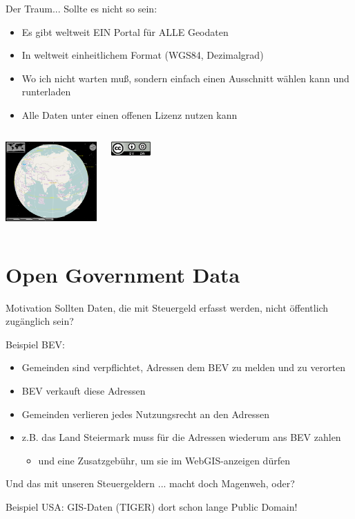 \documentclass{beamer}
\begin{document}
\begin{frame}{Der Traum...}
	Sollte es nicht so sein:
	\begin{itemize}
		\item Es gibt weltweit EIN Portal für ALLE Geodaten
		\item In weltweit einheitlichem Format (WGS84, Dezimalgrad)
		\item Wo ich nicht warten muß, sondern einfach einen Ausschnitt wählen kann und runterladen
		\item Alle Daten unter einen offenen Lizenz nutzen kann
	\end{itemize}

	\begin{columns}[c] 
		    \begin{center}
	\includegraphics[width=3.5cm]{marble.png}
	\end{center}
	    \begin{center}
		\includegraphics[width=1.5cm]{cc-by-sa.png}
	\end{center}
\end{columns}

\end{frame}

\section{Open Government Data}

\begin{frame}{Motivation}
	Sollten Daten, die mit Steuergeld erfasst werden, nicht öffentlich zugänglich sein?

	\vspace{3mm}
	Beispiel BEV:
	\begin{itemize}
		\item Gemeinden sind verpflichtet, Adressen dem BEV zu melden und zu verorten
		\item BEV verkauft diese Adressen
		\item Gemeinden verlieren jedes Nutzungsrecht an den Adressen
		\item z.B. das Land Steiermark muss für die Adressen wiederum ans BEV zahlen
			\pause
		\begin{itemize}
			\item und eine Zusatzgebühr, um sie im WebGIS-anzeigen dürfen
		\end{itemize}
	\end{itemize}

	 Und das mit unseren Steuergeldern ... macht doch Magenweh, oder?

	 \vspace{3mm}
	 Beispiel USA: GIS-Daten (TIGER) dort schon lange Public Domain!
\end{frame}
\end{document}
